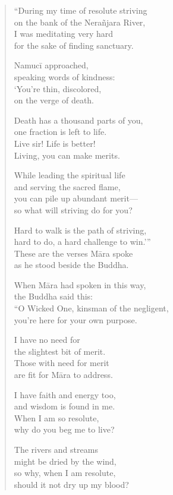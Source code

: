 \documentclass[12pt,openany]{book}%
\begin{document}
\begin{verse}%
“During my time of resolute striving \\
on the bank of the \textsanskrit{Nerañjara} River, \\
I was meditating very hard \\
for the sake of finding sanctuary. 

\textsanskrit{Namucī} approached, \\
speaking words of kindness: \\
‘You’re thin, discolored, \\
on the verge of death. 

Death has a thousand parts of you, \\
one fraction is left to life. \\
Live sir! Life is better! \\
Living, you can make merits. 

While leading the spiritual life \\
and serving the sacred flame, \\
you can pile up abundant merit—\\
so what will striving do for you? 

Hard to walk is the path of striving, \\
hard to do, a hard challenge to win.’” \\
These are the verses \textsanskrit{Māra} spoke \\
as he stood beside the Buddha. 

When \textsanskrit{Māra} had spoken in this way, \\
the Buddha said this: \\
“O Wicked One, kinsman of the negligent, \\
you’re here for your own purpose. 

I have no need for \\
the slightest bit of merit. \\
Those with need for merit \\
are fit for \textsanskrit{Māra} to address. 

I have faith and energy too, \\
and wisdom is found in me. \\
When I am so resolute, \\
why do you beg me to live? 

The rivers and streams \\
might be dried by the wind, \\
so why, when I am resolute, \\
should it not dry up my blood? 


\end{verse}
\end{document}
